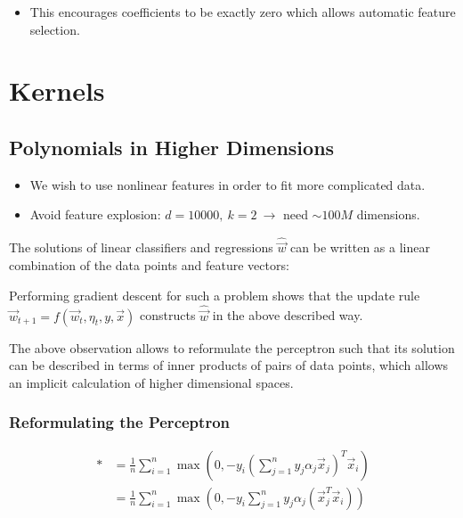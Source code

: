 \documentclass[10pt,a4paper]{scrartcl}
\newcommand{\Argmin}[2]{\text{arg}\underset{#1}{\min}\left(#2\right)}
\begin{document}
\begin{multicols*}{2}
\begin{itemize}
\item This encourages coefficients to be exactly zero which allows automatic feature selection.
\end{itemize}

\section{Kernels}

\subsection{Polynomials in Higher Dimensions}

\begin{itemize}
\item We wish to use nonlinear features in order to fit more complicated data.
\item Avoid feature explosion: $d=10000,\ k=2\ \rightarrow$ need $\sim 100M$ dimensions.
\end{itemize}

The solutions of linear classifiers and regressions $\hat{\vec{w}}$ can be written as a linear combination of the data points and feature vectors:


Performing gradient descent for such a problem shows that the update rule $\vec{w}_{t+1}=f(\vec{w}_t,\eta_t,y,\vec{x})$ constructs $\hat{\vec{w}}$ in the above described way.

The above observation allows to reformulate the perceptron such that its solution can be described in terms of inner products of pairs of data points, which allows an implicit calculation of higher dimensional spaces.

\subsubsection{Reformulating the Perceptron}

\mportant{$\hat{\vec{w}}=\Argmin{\vec{w}}{\underbrace{\frac{1}{n}\sum\limits_{i=1}^n\max(0,-y_i\vec{w}^T\vec{x}_i)}_{\ast}}$}


\begin{align*}
\ast&=\frac{1}{n}\sum\limits_{i=1}^n\max(0,-y_i (\sum\limits_{j=1}^ny_j\alpha_j\vec{x}_j)^T\vec{x}_i)\\
&=\frac{1}{n}\sum\limits_{i=1}^n\max(0,-y_i\sum\limits_{j=1}^n y_j\alpha_j(\vec{x}_j^T\vec{x}_i))
\end{align*}


\end{multicols*}
\end{document}
